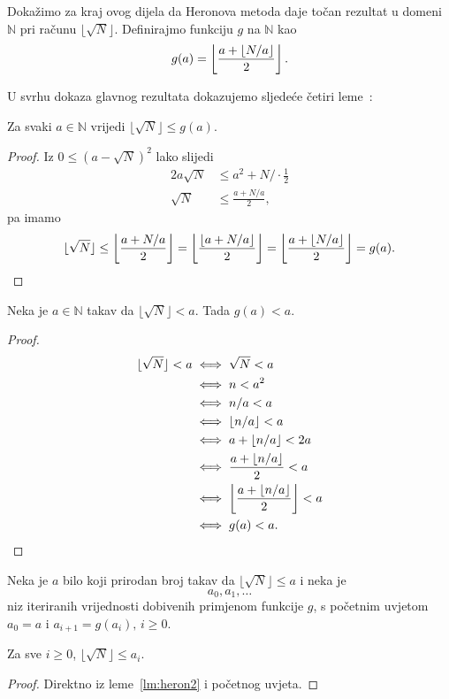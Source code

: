 \documentclass[12pt]{scrartcl}
\begin{document}
Dokažimo za kraj ovog dijela da Heronova metoda daje točan rezultat u domeni $\mathbb N$ pri računu $\lfloor\sqrt{N}\rfloor$.
 Definirajmo funkciju $g$ na $\mathbb N$ kao
\begin{equation}
    g(a) = \left\lfloor\frac{a+\lfloor N/a\rfloor}{2}\right\rfloor\text.
\end{equation}

U svrhu dokaza glavnog rezultata dokazujemo sljedeće četiri leme~\cite{mdickpaper}:
\begin{lema}\label{lm:heron1}
    Za svaki $a\in\mathbb N$ vrijedi $\lfloor\sqrt{N}\rfloor \leq g(a)$.
\end{lema}
\begin{proof}
    Iz $0\leq(a-\sqrt{N})^2$ lako slijedi
    \begin{align*}
        2a\sqrt{N} &\leq a^2 + N\Bigr/\cdot\frac12 \\
        \sqrt{N}&\leq\frac{a+N/a}{2},
    \end{align*}
pa imamo 
\begin{equation*}
    \lfloor\sqrt{N}\rfloor\leq\left\lfloor\frac{a+N/a}{2}\right\rfloor=\left\lfloor\frac{\lfloor a+N/a\rfloor}{2}\right\rfloor
    =\left\lfloor\frac{a+\lfloor N/a\rfloor}{2}\right\rfloor=g(a)\text.
\end{equation*}
\end{proof}

\begin{lema}\label{lm:heron2}
    Neka je $a\in\mathbb N$ takav da $\lfloor\sqrt{N}\rfloor<a$. Tada $g(a)<a$.
\end{lema}
\begin{proof}
    \begin{align*}
        \lfloor\sqrt{N}\rfloor<a &\iff \sqrt{N}<a\\
        &\iff n<a^2\\
        &\iff n/a<a\\
        &\iff \lfloor n/a\rfloor < a\\
        &\iff a+\lfloor n/a\rfloor < 2a\\
        &\iff \frac{a+\lfloor n/a\rfloor}{2}<a\\
        &\iff \left\lfloor\frac{a+\lfloor n/a\rfloor}{2}\right\rfloor < a\\
        &\iff g(a) < a\text.
    \end{align*}
\end{proof}

Neka je $a$ bilo koji prirodan broj takav da $\lfloor\sqrt{N}\rfloor\leq a$ i neka je
\begin{equation*}
    a_0,a_1,\dotsc
\end{equation*}
niz iteriranih vrijednosti dobivenih primjenom funkcije $g$, s početnim uvjetom $a_0=a$ i $a_{i+1}=g(a_i),\,i\geq 0$.
\begin{lema}\label{lm:heron3}
    Za sve $i\geq 0$, $\lfloor\sqrt{N}\rfloor\leq a_i$.
\end{lema}
\begin{proof}
    Direktno iz leme~\ref{lm:heron2} i početnog uvjeta.
\end{proof}
\end{document}
